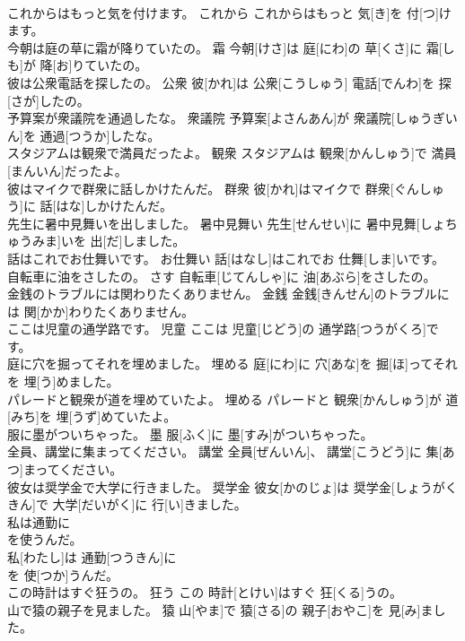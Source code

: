 \documentclass[8pt]{extreport}
\begin{document}
\begin{CJK}{UTF8}{min}
\\	これからはもっと気を付けます。	これから	これからはもっと 気[き]を 付[つ]けます。	
\\	今朝は庭の草に霜が降りていたの。	霜	今朝[けさ]は 庭[にわ]の 草[くさ]に 霜[しも]が 降[お]りていたの。	
\\	彼は公衆電話を探したの。	公衆	彼[かれ]は 公衆[こうしゅう] 電話[でんわ]を 探[さが]したの。	
\\	予算案が衆議院を通過したな。	衆議院	予算案[よさんあん]が 衆議院[しゅうぎいん]を 通過[つうか]したな。	
\\	スタジアムは観衆で満員だったよ。	観衆	スタジアムは 観衆[かんしゅう]で 満員[まんいん]だったよ。	
\\	彼はマイクで群衆に話しかけたんだ。	群衆	彼[かれ]はマイクで 群衆[ぐんしゅう]に 話[はな]しかけたんだ。	
\\	先生に暑中見舞いを出しました。	暑中見舞い	先生[せんせい]に 暑中見舞[しょちゅうみま]いを 出[だ]しました。	
\\	話はこれでお仕舞いです。	お仕舞い	話[はなし]はこれでお 仕舞[しま]いです。	
\\	自転車に油をさしたの。	さす	自転車[じてんしゃ]に 油[あぶら]をさしたの。	
\\	金銭のトラブルには関わりたくありません。	金銭	金銭[きんせん]のトラブルには 関[かか]わりたくありません。	
\\	ここは児童の通学路です。	児童	ここは 児童[じどう]の 通学路[つうがくろ]です。	
\\	庭に穴を掘ってそれを埋めました。	埋める	庭[にわ]に 穴[あな]を 掘[ほ]ってそれを 埋[う]めました。	
\\	パレードと観衆が道を埋めていたよ。	埋める	パレードと 観衆[かんしゅう]が 道[みち]を 埋[うず]めていたよ。	
\\	服に墨がついちゃった。	墨	服[ふく]に 墨[すみ]がついちゃった。	
\\	全員、講堂に集まってください。	講堂	全員[ぜんいん]、 講堂[こうどう]に 集[あつ]まってください。	
\\	彼女は奨学金で大学に行きました。	奨学金	彼女[かのじょ]は 奨学金[しょうがくきん]で 大学[だいがく]に 行[い]きました。	
\\	私は通勤に
\\	を使うんだ。	
\\	私[わたし]は 通勤[つうきん]に 
\\	[じぇいあーる]を 使[つか]うんだ。	
\\	この時計はすぐ狂うの。	狂う	この 時計[とけい]はすぐ 狂[くる]うの。	
\\	山で猿の親子を見ました。	猿	山[やま]で 猿[さる]の 親子[おやこ]を 見[み]ました。	

\end{CJK}
\end{document}
